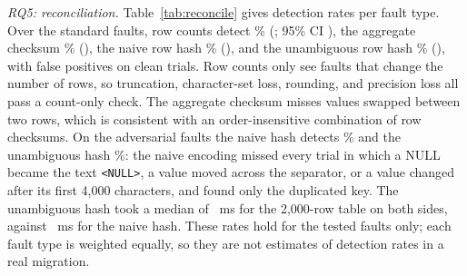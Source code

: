 
\textit{RQ5: reconciliation.} Table~\ref{tab:reconcile} gives detection rates per fault type. Over the
standard faults, row counts detect \RecRowcount\% (\RecRowcountN; 95\% CI \RecRowcountCI), the aggregate
checksum \RecAggregate\% (\RecAggregateCI), the naive row hash \RecRowhashNaive\% (\RecRowhashNaiveCI), and
the unambiguous row hash \RecRowhash\% (\RecRowhashCI), with \RecFalsePos{} false positives on clean trials.
Row counts only see faults that change the number of rows, so truncation, character-set loss, rounding, and
precision loss all pass a count-only check. The aggregate checksum misses values swapped between two rows,
which is consistent with an order-insensitive combination of row checksums. On the adversarial faults the
naive hash detects \RecRowhashNaiveAdv\% and the unambiguous hash \RecRowhashAdv\%: the naive encoding
missed every trial in which a NULL became the text \texttt{<NULL>}, a value moved across the separator, or a
value changed after its first 4{,}000 characters, and found only the duplicated key. The unambiguous hash
took a median of \RecMsRowhash{}~ms for the 2{,}000-row table on both sides, against \RecMsNaive{}~ms for the
naive hash. These rates hold for the
tested faults only; each fault type is weighted equally, so they are not estimates of detection rates in a
real migration.
